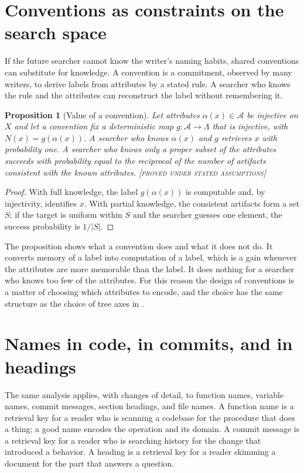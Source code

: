 \documentclass[11pt,twoside,openright]{book}
\theoremstyle{plain}
\newtheorem{proposition}[theorem]{Proposition}
\theoremstyle{definition}
\theoremstyle{remark}
\newcommand{\Proved}{\textup{\textsc{[proved under stated assumptions]}}}
\begin{document}
\section{Conventions as constraints on the search space}

If the future searcher cannot know the writer's naming habits, shared conventions can substitute for knowledge. A convention is a commitment, observed by many writers, to derive labels from attributes by a stated rule. A searcher who knows the rule and the attributes can reconstruct the label without remembering it.

\begin{proposition}[Value of a convention]\label{prop:convention}
Let attributes $\alpha(x)\in\mathcal{A}$ be injective on $X$ and let a convention fix a deterministic map $g:\mathcal{A}\to\Lambda$ that is injective, with $N(x)=g(\alpha(x))$. A searcher who knows $\alpha(x)$ and $g$ retrieves $x$ with probability one. A searcher who knows only a proper subset of the attributes succeeds with probability equal to the reciprocal of the number of artifacts consistent with the known attributes.
\Proved{}
\end{proposition}

\begin{proof}
With full knowledge, the label $g(\alpha(x))$ is computable and, by injectivity, identifies $x$. With partial knowledge, the consistent artifacts form a set $S$; if the target is uniform within $S$ and the searcher guesses one element, the success probability is $1/|S|$.
\end{proof}

The proposition shows what a convention does and what it does not do. It converts memory of a label into computation of a label, which is a gain whenever the attributes are more memorable than the label. It does nothing for a searcher who knows too few of the attributes. For this reason the design of conventions is a matter of choosing which attributes to encode, and the choice has the same structure as the choice of tree axes in .

\section{Names in code, in commits, and in headings}

The same analysis applies, with changes of detail, to function names, variable names, commit messages, section headings, and file names. A function name is a retrieval key for a reader who is scanning a codebase for the procedure that does a thing; a good name encodes the operation and its domain. A commit message is a retrieval key for a reader who is searching history for the change that introduced a behavior. A heading is a retrieval key for a reader skimming a document for the part that answers a question.
\end{document}
